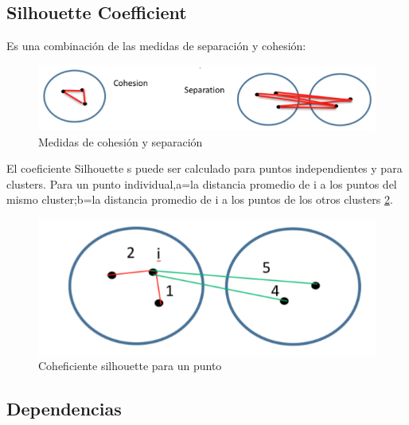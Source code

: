 \documentclass[10pt,a4paper]{article}
\begin{document}
\subsection*{Silhouette Coefficient}

Es una combinación de las medidas de separación y cohesión:

\begin{figure}[H]
	\centering
	\includegraphics[scale=0.50]{./img/silhouette00.png}%
	\caption[Clusters:Separación y cohesión]{Medidas de cohesión y separación}
	\label{fig:medidas}
\end{figure}

El coeficiente Silhouette s puede ser calculado para puntos independientes y para clusters. Para un punto individual,a=la distancia promedio de i a los puntos del mismo cluster;b=la distancia promedio de i a los puntos de los otros clusters \ref{fig:coeficiente}.

\begin{figure}[H]
	\centering
	\includegraphics[scale=0.50]{./img/silhouette01.png}%
	\caption[Coeficiente silhouette para un punto i]{Coheficiente silhouette para un punto}
	\label{fig:coeficiente}
\end{figure}

\newpage

\subsection*{Dependencias}
\end{document}
